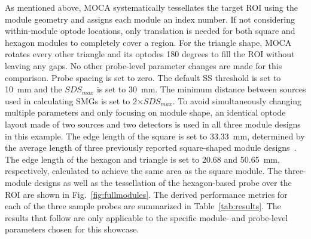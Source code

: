 As mentioned above, \ac{MOCA} systematically tessellates the target \ac{ROI} using the module geometry and assigns each module an index number. If not considering within-module optode locations, only translation is needed for both square and hexagon modules to completely cover a region. For the triangle shape, \ac{MOCA} rotates every other triangle and its optodes 180 degrees to fill the \ac{ROI} without leaving any gaps. No other probe-level parameter changes are made for this comparison. Probe spacing is set to zero. The default \ac{SS} threshold is set to 10~mm and the $SDS_{max}$ is set to 30~mm. The minimum distance between sources used in calculating \ac{SMG}s is set to 2$\times SDS_{max}$. To avoid simultaneously changing multiple parameters and only focusing on module shape, an identical optode layout made of two sources and two detectors is used in all three module designs in this example. The edge length of the square is set to 33.33~mm, determined by the average length of three previously reported square-shaped module designs~\cite{Chitnis2016, Bci2017, Zimmermann2013}. The edge length of the hexagon and triangle is set to 20.68 and 50.65~mm, respectively, calculated to achieve the same area as the square module. The three-module designs as well as the tessellation of the hexagon-based probe over the \ac{ROI} are shown in Fig.~\ref{fig:fullmodules}. The derived performance metrics for each of the three sample probes are summarized in Table~\ref{tab:results}. The results that follow are only applicable to the specific module- and probe-level parameters chosen for this showcase.

